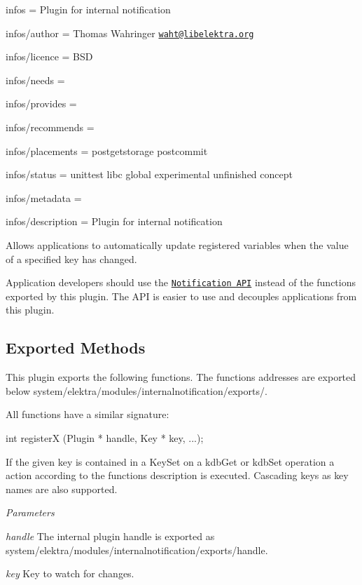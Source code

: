 
\begin{DoxyItemize}
\item infos = Plugin for internal notification
\item infos/author = Thomas Wahringer \href{mailto:waht@libelektra.org}{\tt waht@libelektra.\+org}
\item infos/licence = B\+SD
\item infos/needs =
\item infos/provides =
\item infos/recommends =
\item infos/placements = postgetstorage postcommit
\item infos/status = unittest libc global experimental unfinished concept
\item infos/metadata =
\item infos/description = Plugin for internal notification
\end{DoxyItemize}

Allows applications to automatically update registered variables when the value of a specified key has changed.

Application developers should use the \href{https://doc.libelektra.org/api/current/html/group__kdbnotification.html}{\tt Notification A\+PI} instead of the functions exported by this plugin. The A\+PI is easier to use and decouples applications from this plugin.

\subsection*{Exported Methods}

This plugin exports the following functions. The functions addresses are exported below {\ttfamily system/elektra/modules/internalnotification/exports/}.

All functions have a similar signature\+:


\begin{DoxyCode}
\textcolor{keywordtype}{int} registerX (Plugin * handle, Key * key, ...);
\end{DoxyCode}


If the given {\ttfamily key} is contained in a Key\+Set on a kdb\+Get or kdb\+Set operation a action according to the function\textquotesingle{}s description is executed. Cascading keys as {\ttfamily key} names are also supported.

{\itshape Parameters}


\begin{DoxyItemize}
\item {\itshape handle} The internal plugin {\ttfamily handle} is exported as {\ttfamily system/elektra/modules/internalnotification/exports/handle}.
\item {\itshape key} Key to watch for changes.
\end{DoxyItemize}

